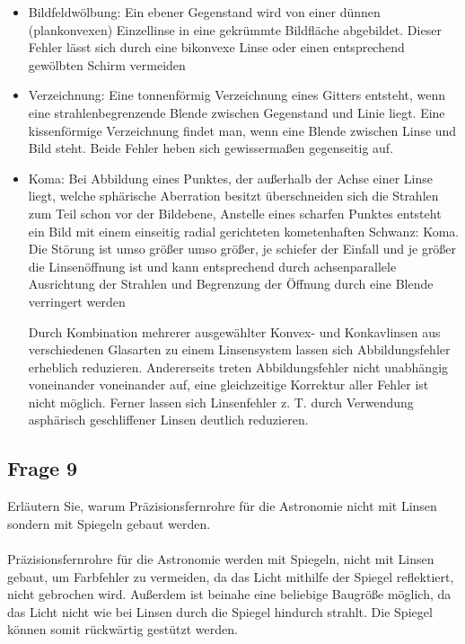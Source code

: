 \documentclass[a4paper,10pt]{scrartcl}
\begin{document}
			
	
		\begin{itemize}
			\item Bildfeldwölbung: Ein ebener Gegenstand wird von einer dünnen (plankonvexen) Einzellinse in eine gekrümmte Bildfläche abgebildet. Dieser Fehler lässt sich durch eine bikonvexe Linse oder einen entsprechend gewölbten Schirm vermeiden
		
				
		
			\item Verzeichnung: Eine tonnenförmig Verzeichnung eines Gitters entsteht, wenn eine strahlenbegrenzende Blende zwischen Gegenstand und Linie liegt. Eine kissenförmige Verzeichnung findet man, wenn eine Blende zwischen Linse und Bild steht. Beide Fehler heben sich gewissermaßen gegenseitig auf.
		
				
			
			\item Koma: Bei Abbildung eines Punktes, der außerhalb der Achse einer Linse liegt, welche sphärische Aberration besitzt überschneiden sich die Strahlen zum Teil schon vor der Bildebene, Anstelle eines scharfen Punktes entsteht ein Bild mit einem einseitig radial gerichteten kometenhaften Schwanz: Koma. Die Störung ist umso größer umso größer, je schiefer der Einfall und je größer die Linsenöffnung ist und kann entsprechend durch achsenparallele Ausrichtung der Strahlen und Begrenzung der Öffnung durch eine Blende verringert werden
			
				
	
			Durch Kombination mehrerer ausgewählter Konvex- und Konkavlinsen aus verschiedenen Glasarten zu einem Linsensystem lassen sich Abbildungsfehler erheblich reduzieren. Andererseits treten Abbildungsfehler nicht unabhängig voneinander voneinander auf, eine gleichzeitige Korrektur aller Fehler ist nicht möglich. Ferner lassen sich Linsenfehler z. T. durch Verwendung asphärisch geschliffener Linsen deutlich reduzieren.
		\end{itemize}	
	\subsection{Frage 9}
		Erläutern Sie, warum Präzisionsfernrohre für die Astronomie nicht mit Linsen sondern mit Spiegeln gebaut werden.
		\\
		\\
		Präzisionsfernrohre für die Astronomie werden mit Spiegeln, nicht mit Linsen gebaut, um Farbfehler zu vermeiden, da das Licht mithilfe der Spiegel reflektiert, nicht gebrochen wird. Außerdem ist beinahe eine beliebige Baugröße möglich, da das Licht nicht wie bei Linsen durch die Spiegel hindurch strahlt. Die Spiegel können somit rückwärtig gestützt werden.
\end{document}
